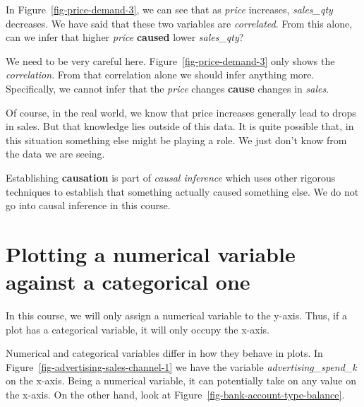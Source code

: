 \documentclass[
  12pt,
  letterpaper,
  DIV=11,
  numbers=noendperiod]{scrreprt}
\begin{document}
\begin{tcolorbox}[enhanced jigsaw, colback=white, leftrule=.75mm, toprule=.15mm, bottomtitle=1mm, breakable, coltitle=black, toptitle=1mm, title=\textcolor{quarto-callout-important-color}{\faExclamation}\hspace{0.5em}{Correlation vs.~\emph{Causation}}, opacitybacktitle=0.6, colbacktitle=quarto-callout-important-color!10!white, arc=.35mm, left=2mm, colframe=quarto-callout-important-color-frame, titlerule=0mm, rightrule=.15mm, bottomrule=.15mm, opacityback=0]

In Figure~\ref{fig-price-demand-3}, we can see that as \emph{price}
increases, \emph{sales\_qty} decreases. We have said that these two
variables are \emph{correlated}. From this alone, can we infer that
higher \emph{price} \textbf{caused} lower \emph{sales\_qty}?

We need to be very careful here. Figure~\ref{fig-price-demand-3} only
shows the \emph{correlation}. From that correlation alone we should
infer anything more. Specifically, we cannot infer that the \emph{price}
changes \textbf{cause} changes in \emph{sales}.

Of course, in the real world, we know that price increases generally
lead to drops in sales. But that knowledge lies outside of this data. It
is quite possible that, in this situation something else might be
playing a role. We just don't know from the data we are seeing.

Establishing \textbf{causation} is part of \emph{causal inference} which
uses other rigorous techniques to establish that something actually
caused something else. We do not go into causal inference in this
course.

\end{tcolorbox}

\section{Plotting a numerical variable against a categorical
one}\label{plotting-a-numerical-variable-against-a-categorical-one}

In this course, we will only assign a numerical variable to the y-axis.
Thus, if a plot has a categorical variable, it will only occupy the
x-axis.

Numerical and categorical variables differ in how they behave in plots.
In Figure~\ref{fig-advertising-sales-channel-1} we have the variable
\emph{advertising\_spend\_k} on the x-axis. Being a numerical variable,
it can potentially take on any value on the x-axis. On the other hand,
look at Figure~\ref{fig-bank-account-type-balance}.
\end{document}
